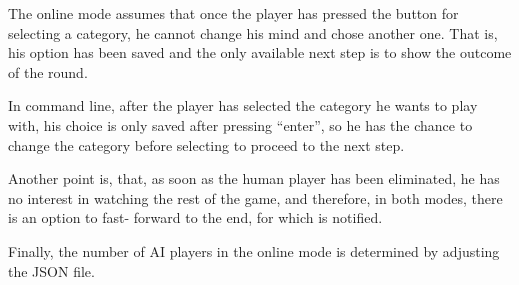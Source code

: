 The online mode assumes that once the player has pressed the button for selecting a category, he cannot change his mind and chose another one. That is, his option has been saved and the only available next step is to show the outcome of the round.

In command line, after the player has selected the category he wants to play with, his choice is only saved after pressing ``enter'', so he has the chance to change the category before selecting to proceed to the next step.

Another point is, that, as soon as the human player has been eliminated, he has no interest in watching the rest of the game, and therefore, in both modes, there is an option to fast- forward to the end, for which is notified.

Finally, the number of AI players in the online mode is determined by adjusting the JSON file.
